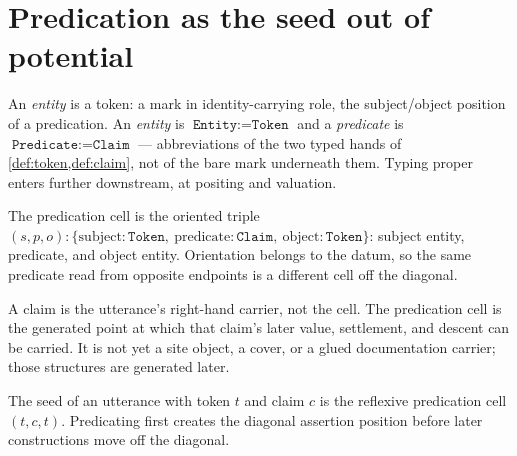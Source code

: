 \section{Predication as the seed out of potential}

\begin{proposition}\label{thm:entity-predicate}\leanok{}
An \emph{entity} is a token: a mark in identity-carrying role, the
subject/object position of a predication. An \emph{entity} is
$\texttt{Entity} := \texttt{Token}$ and a \emph{predicate} is
$\texttt{Predicate} := \texttt{Claim}$ --- abbreviations of the two typed
hands of \cref{def:token,def:claim}, not of the bare mark underneath them.
Typing proper enters further downstream, at positing and valuation.
\end{proposition}

\begin{proposition}\label{thm:predication}\leanok{}
The predication cell is the oriented triple $(s,p,o) : \{\text{subject} :
\texttt{Token},\ \text{predicate} : \texttt{Claim},\ \text{object} :
\texttt{Token}\}$: subject entity, predicate, and object entity. Orientation
belongs to the datum, so the same predicate read from opposite endpoints is a
different cell off the diagonal.
\end{proposition}

\begin{proposition}\label{thm:claim-point}\leanok{}
A claim is the utterance's right-hand carrier, not the cell. The predication
cell is the generated point at which that claim's later value, settlement, and
descent can be carried. It is not yet a site object, a cover, or a glued
documentation carrier; those structures are generated later.
\end{proposition}

\begin{proposition}\label{thm:predication-seed}\leanok{}
The seed of an utterance with token $t$ and claim $c$ is the reflexive
predication cell $(t,c,t)$. Predicating first creates the diagonal assertion
position before later constructions move off the diagonal.
\end{proposition}

